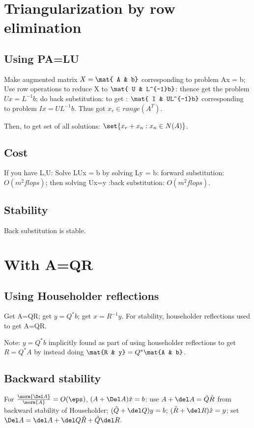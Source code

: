 \documentclass[oneside, article]{memoir}
\begin{document}
\section{Triangularization by row elimination}
\subsection{Using PA=LU}
Make augmented matrix $X = \mat{ A & b}$ corresponding to problem Ax = b; Use row operations to reduce X to $\mat{ U & L^{-1}b}$: thence get the problem $U x = L^{-1}b$; do back substitution: to get : $\mat{ I & UL^{-1}b}$ corresponding to problem $Ix = UL^{-1}b$. Thus got $x_r \in range(A^{T})$.

Then, to get set of all solutions: $\set{x_r + x_n: x_n \in N(A)}$.

\subsection{Cost}
If you have L,U: Solve LUx = b by solving Ly = b: forward substitution: $O(m^{2} flops)$; then solving Ux=y :back substitution: $O(m^{2} flops)$.

\subsection{Stability}
Back substitution is stable.

\section{With A=QR}
\subsection{Using Householder reflections}
Get A=QR; get $y = Q^{*}b$; get $x = R^{-1}y$. For stability, householder reflections used to get A=QR.

Note: $y = Q^{*}b$ implicitly found as part of using householder reflections to get $R = Q^{*}A$ by instead doing $\mat{R & y} = Q^{*}\mat{A & b}$.

\subsection{Backward stability}
For $\frac{\norm{\Del A}}{\norm{A}} = O(\eps)$, $(A+ \Del A)\hat{x} = b$: use $A + \del A= \tilde{Q}\tilde{R}$ from backward stability of Householder; $(\tilde{Q}+\del Q)y = b$; $(\tilde{R} + \del R)\hat{x} = y$; set $\Del A = \del A + \del Q\tilde{R} + \tilde{Q}\del R$.
\end{document}
